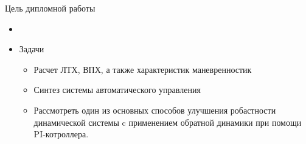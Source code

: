 \begin{frame}{Цель дипломной работы}
\begin{itemize}
    \item <+-> []
    \item <+-> [] \begin{block}{Задачи}
        \begin{itemize}
        \item Расчет ЛТХ, ВПХ, а также характеристик маневренностик
        \item Синтез системы автоматического управления
        \item Рассмотреть один из основных способов улучшения робастности динамической 
        системы c применением обратной динамики при помощи PI-котроллера.
        \end{itemize}
    \end{block}
\end{itemize}    
\end{frame}